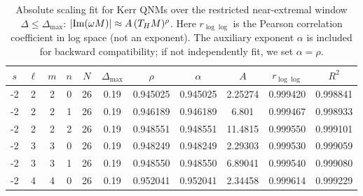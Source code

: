 \begin{table}[t]
\centering
\begin{tabular}{ccccccccccc}
\toprule
$s$ & $\ell$ & $m$ & $n$ & $N$ & $\Delta_{\max}$ & $\rho$ & $\alpha$ & $A$ & $r_{\log\log}$ & $R^2$ \\
\midrule
-2 & 2 & 2 & 0 & 26 & 0.19 & 0.945025 & 0.945025 & 2.25274 & 0.999420 & 0.998841 \\
-2 & 2 & 2 & 1 & 26 & 0.19 & 0.946189 & 0.946189 & 6.801 & 0.999467 & 0.998933 \\
-2 & 2 & 2 & 2 & 26 & 0.19 & 0.948551 & 0.948551 & 11.4815 & 0.999550 & 0.999101 \\
-2 & 3 & 3 & 0 & 26 & 0.19 & 0.948249 & 0.948249 & 2.29303 & 0.999530 & 0.999059 \\
-2 & 3 & 3 & 1 & 26 & 0.19 & 0.948550 & 0.948550 & 6.89041 & 0.999540 & 0.999080 \\
-2 & 4 & 4 & 0 & 26 & 0.19 & 0.952041 & 0.952041 & 2.34458 & 0.999614 & 0.999229 \\
\bottomrule
\end{tabular}
\caption{Absolute scaling fit for Kerr QNMs over the restricted near-extremal window $\Delta \le \Delta_{\max}$: $|{\rm Im}(\omega M)| \approx A\,(T_H M)^{\rho}$. Here $r_{\log\log}$ is the Pearson correlation coefficient in log space (not an exponent). The auxiliary exponent $\alpha$ is included for backward compatibility; if not independently fit, we set $\alpha=\rho$.}
\label{tab:qnm_abs_scaling}
\end{table}
